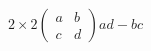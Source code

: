 \documentclass[preview]{standalone}
\begin{document}
\begin{center}
$ 2 \times 2 $\text{, }$ \begin{pmatrix} a & b \\ c & d \end{pmatrix} $$ ad - bc $
\end{center}
\end{document}

